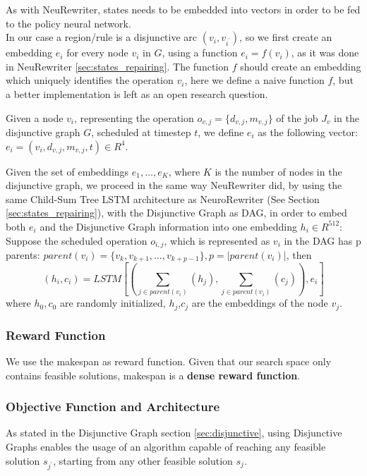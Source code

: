 \documentclass[12pt]{article}
\begin{document}
\medbreak
As with NeuRewriter, states needs to be embedded into vectors in order to be fed to the policy neural network.\\
 In our case a region/rule is a disjunctive arc $(v_i,v_{i^{'}})$, so we first create an embedding $e_i$ for every node $v_i$ in $G$, using a function $e_i = f(v_i)$, as it was done in NeuRewriter \ref{sec:states_repairing}. 
 The function $f$ should create an embedding which uniquely identifies the operation $v_i$, here we define a naive function $f$, but a better implementation is left as an open research question.

 \medbreak
 Given a node $v_i$, representing the operation $o_{v,j}=\{d_{v,j},m_{v,j}\}$ of the job $J_v$ in the disjunctive graph $G$, scheduled at timestep $t$, we define $e_i$ as the following vector: 
 $e_{i} = (v_i, d_{v,j}, m_{v,j}, t) \in R^{4}$.

 \medbreak
 Given the set of embeddings $e_1,\dots,e_{K}$, where $K$ is the number of nodes in the disjunctive graph, we proceed in the same way NeuRewriter did, 
 by using the same Child-Sum Tree LSTM architecture as NeuroRewriter \cite{lstm_tree} (See Section \ref{sec:states_repairing}), with the Disjunctive Graph as DAG, in order to embed both $e_i$ and the Disjunctive Graph information into one embedding $h_i \in R^{512}$: 
 Suppose the scheduled operation $o_{i,j}$, which is represented as $v_i$ in the DAG has p parents: $parent(v_i) = \{v_k,v_{k+1},\dots,v_{k+p-1}\}, p = |parent(v_i)|$, then $$(h_i,c_i) = LSTM[(\sum_{j \in parent(v_i)}(h_j), \sum_{j \in parent(v_i)}(c_j)), e_i]$$
where $h_0, c_0$ are randomly initialized, $h_j$,$c_j$ are the embeddings of the node $v_j$.\\

\medbreak
\subsubsection{Reward Function}
We use the makespan as reward function. Given that our search space only contains feasible solutions, makespan is a \textbf{dense reward function}.

\medbreak
\subsubsection{Objective Function and Architecture}
As stated in the Disjunctive Graph section \ref{sec:disjunctive}, using Disjunctive Graphs enables the usage of an algorithm capable of reaching any feasible solution $s_{j^{'}}$, starting from any other feasible solution $s_{j}$.
\end{document}
